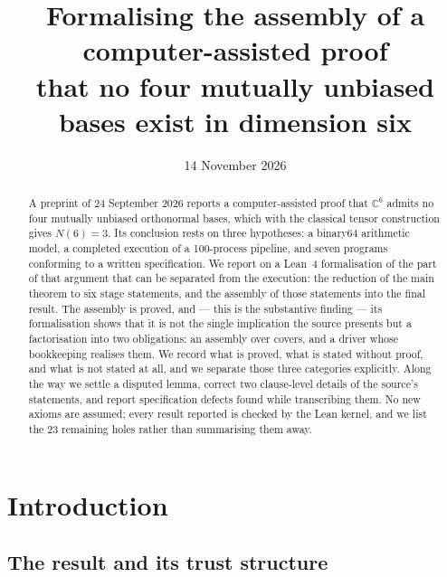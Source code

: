 \documentclass[11pt]{article}
\title{\bfseries Formalising the assembly of a computer-assisted proof\\[2pt]
that no four mutually unbiased bases exist in dimension six}
\author{}
\date{14 November 2026}
\theoremstyle{definition}
\newcommand{\C}{\mathbb{C}}
\begin{document}
\maketitle

\begin{abstract}
A preprint of 24 September 2026 reports a computer-assisted proof that $\C^6$ admits no four
mutually unbiased orthonormal bases, which with the classical tensor construction gives $N(6)=3$.
Its conclusion rests on three hypotheses: a binary64 arithmetic model, a completed execution of a
100-process pipeline, and seven programs conforming to a written specification. We report on a
Lean~4 formalisation of the part of that argument that can be separated from the execution: the
reduction of the main theorem to six stage statements, and the assembly of those statements into
the final result. The assembly is proved, and --- this is the substantive finding --- its
formalisation shows that it is not the single implication the source presents but a factorisation
into two obligations: an assembly over covers, and a driver whose bookkeeping realises them. We
record what is proved, what is stated without proof, and what is not stated at all, and we separate
those three categories explicitly. Along the way we settle a disputed lemma, correct two
clause-level details of the source's statements, and report specification defects found while
transcribing them. No new axioms are assumed; every result reported is checked by the Lean kernel,
and we list the 23 remaining holes rather than summarising them away.
\end{abstract}

\tableofcontents

\section{Introduction}

\subsection{The result and its trust structure}
\end{document}
